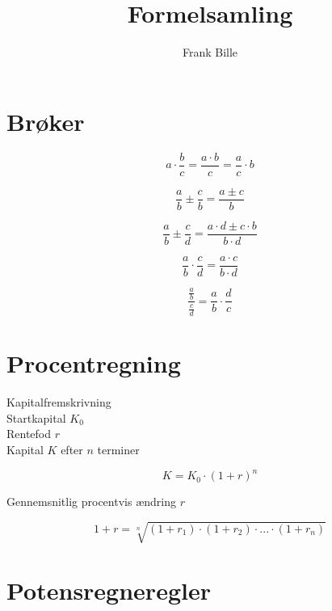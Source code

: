 \documentclass[11pt,a4paper,landscape,twocolumn,fleqn,leqno]{article}
\author{Frank Bille}
\title{Formelsamling}
\begin{document}
\tableofcontents

\newpage

\setlength{\parindent}{0mm}

\section{Brøker}

\begin{equation}
a \cdot \frac{b}{c} = \frac{a \cdot b}{c} = \frac{a}{c} \cdot b
\end{equation}

\begin{equation}
\frac{a}{b} \pm \frac{c}{b} = \frac{a \pm c}{b}
\end{equation}

\begin{equation}
\frac{a}{b} \pm \frac{c}{d} = \frac{a \cdot d \pm c \cdot b}{b \cdot d}
\end{equation}

\begin{equation}
\frac{a}{b} \cdot \frac{c}{d} = \frac{a \cdot c}{b \cdot d}
\end{equation}

\begin{equation}
\frac{\frac{a}{b}}{\frac{c}{d}} = \frac{a}{b} \cdot \frac{d}{c}
\end{equation}

\section{Procentregning}

Kapitalfremskrivning \\
Startkapital $K_0$ \\
Rentefod $r$ \\
Kapital $K$ efter $n$ terminer

\begin{equation}
K = K_{0} \cdot \left(1+r\right)^{n}
\end{equation}

Gennemsnitlig procentvis ændring $r$

\begin{equation}
1+r = \sqrt[n]{\left(1+r_{1}\right) \cdot \left(1+r_{2}\right) \cdot ... \cdot \left(1+r_{n}\right)}
\end{equation} 

\section{Potensregneregler}
\end{document}
